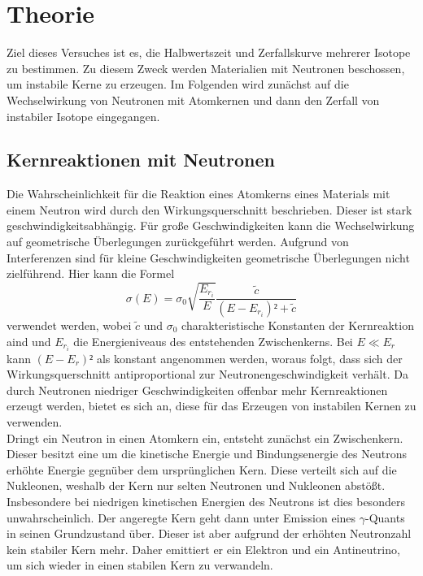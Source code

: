 \section{Theorie}
\label{sec:Theorie}

Ziel dieses Versuches ist es, die Halbwertszeit und Zerfallskurve mehrerer Isotope zu bestimmen.
Zu diesem Zweck werden Materialien mit Neutronen beschossen, um instabile Kerne zu erzeugen. Im 
Folgenden wird zunächst auf die Wechselwirkung von Neutronen mit Atomkernen und dann den Zerfall 
von instabiler Isotope eingegangen.

\subsection{Kernreaktionen mit Neutronen}
    \label{sec:Neutronen}
    Die Wahrscheinlichkeit für die Reaktion eines Atomkerns eines Materials mit einem Neutron wird
    durch den Wirkungsquerschnitt beschrieben. Dieser ist stark geschwindigkeitsabhängig. Für große 
    Geschwindigkeiten kann die Wechselwirkung auf geometrische Überlegungen zurückgeführt werden. 
    Aufgrund von Interferenzen sind für kleine Geschwindigkeiten geometrische Überlegungen nicht 
    zielführend. Hier kann die Formel
    \begin{equation*}
        \sigma (E) = \sigma_0 \sqrt{\dfrac{E_{r_i}}{E}}\dfrac{\tilde{c}}{(E-E_{r_i})²+\tilde{c}}
    \end{equation*}
    verwendet werden, wobei $\tilde{c}$ und $\sigma_0$ charakteristische Konstanten der Kernreaktion
    aind und $E_{r_i}$ die Energieniveaus des entstehenden Zwischenkerns. Bei $E \ll E_{r}$ kann 
    $(E-E_r)²$ als konstant angenommen werden, woraus folgt, dass sich der Wirkungsquerschnitt 
    antiproportional zur Neutronengeschwindigkeit verhält. Da durch Neutronen niedriger 
    Geschwindigkeiten offenbar mehr Kernreaktionen erzeugt werden, bietet es sich an, diese für 
    das Erzeugen von instabilen Kernen zu verwenden.\\
    Dringt ein Neutron in einen Atomkern ein, entsteht zunächst ein Zwischenkern. Dieser besitzt 
    eine um die kinetische Energie und Bindungsenergie des Neutrons erhöhte Energie gegnüber dem 
    ursprünglichen Kern. Diese verteilt sich auf die Nukleonen, weshalb der Kern nur selten Neutronen 
    und Nukleonen abstößt. Insbesondere bei niedrigen kinetischen Energien des Neutrons ist dies 
    besonders unwahrscheinlich. Der angeregte Kern geht dann unter Emission eines $\gamma$-Quants 
    in seinen Grundzustand über. Dieser ist aber aufgrund der erhöhten Neutronzahl kein stabiler 
    Kern mehr. Daher emittiert er ein Elektron und ein Antineutrino, um sich wieder in einen stabilen 
    Kern zu verwandeln.
